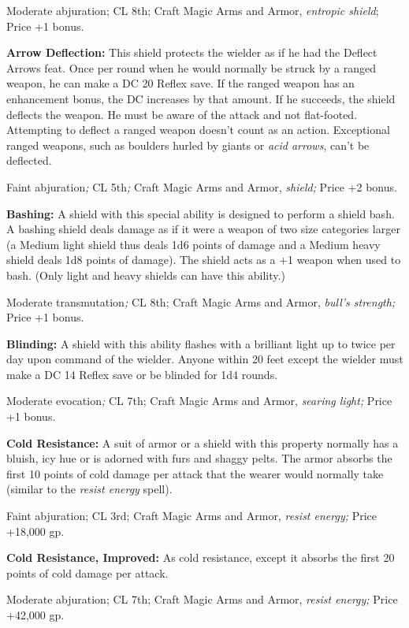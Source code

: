 Moderate abjuration; CL 8th; Craft Magic Arms and Armor, \textit{entropic shield}; 
Price +1 bonus.

\textbf{Arrow Deflection:} This shield protects the wielder as if he had the Deflect 
Arrows feat. Once per round when he would normally be struck by a ranged weapon, 
he can make a DC 20 Reflex save. If the ranged weapon has an enhancement bonus, 
the DC increases by that amount. If he succeeds, the shield deflects the weapon. 
He must be aware of the attack and not flat-footed. Attempting to deflect a ranged 
weapon doesn't count as an action. Exceptional ranged weapons, such as boulders 
hurled by giants or \textit{acid arrows}, can't be deflected.

Faint abjuration\textit{; }CL 5th\textit{; }Craft Magic Arms and Armor, \textit{shield; 
}Price +2 bonus.

\textbf{Bashing:} A shield with this special ability is designed to perform a shield 
bash. A bashing shield deals damage as if it were a weapon of two size categories 
larger (a Medium light shield thus deals 1d6 points of damage and a Medium heavy 
shield deals 1d8 points of damage). The shield acts as a +1 weapon when used to 
bash. (Only light and heavy shields can have this ability.)

Moderate transmutation\textit{; }CL 8th; Craft Magic Arms and Armor, \textit{bull's 
strength; }Price +1 bonus.

\textbf{Blinding:} A shield with this ability flashes with a brilliant light up 
to twice per day upon command of the wielder. Anyone within 20 feet except the 
wielder must make a DC 14 Reflex save or be blinded for 1d4 rounds.

Moderate evocation\textit{; }CL 7th; Craft Magic Arms and Armor, \textit{searing 
light; }Price +1 bonus.

\textbf{Cold Resistance:} A suit of armor or a shield with this property normally 
has a bluish, icy hue or is adorned with furs and shaggy pelts. The armor absorbs 
the first 10 points of cold damage per attack that the wearer would normally take 
(similar to the \textit{resist energy }spell).

Faint abjuration; CL 3rd; Craft Magic Arms and Armor, \textit{resist energy; }Price 
+18,000 gp.

\textbf{Cold Resistance, Improved:} As cold resistance, except it absorbs the first 
20 points of cold damage per attack.

Moderate abjuration; CL 7th; Craft Magic Arms and Armor, \textit{resist energy; 
}Price +42,000 gp.

